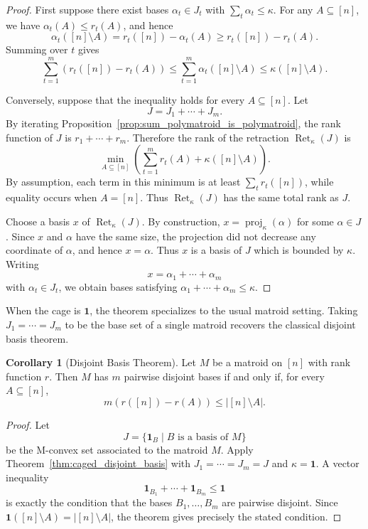 \documentclass[11pt]{article}
\theoremstyle{definition}
\newtheorem{corollary}[theorem]{Corollary}
\theoremstyle{remark}
\newcommand{\ones}{\textbf{1}}
\DeclareMathOperator{\proj}{proj}              %
\newcommand{\kproj}{\proj_{\kappa}}            %
\DeclareMathOperator{\Ret}{Ret}                %
\newcommand{\RetK}{\Ret_{\kappa}}              %
\begin{document}
\begin{proof}
    First suppose there exist bases $\alpha_t\in J_t$ with
    $\sum_t\alpha_t\leq\kappa$. For any $A\subseteq[n]$, we have
    $\alpha_t(A)\leq r_t(A)$, and hence
    \[
        \alpha_t([n]\setminus A)
        =
        r_t([n])-\alpha_t(A)
        \geq
        r_t([n])-r_t(A).
    \]
    Summing over $t$ gives
    \[
        \sum_{t=1}^m
        \left(
            r_t([n])-r_t(A)
        \right)
        \leq
        \sum_{t=1}^m\alpha_t([n]\setminus A)
        \leq
        \kappa([n]\setminus A).
    \]

    Conversely, suppose that the inequality holds for every
    $A\subseteq[n]$. Let
    \[
        J=J_1+\cdots+J_m.
    \]
    By iterating
    Proposition~\ref{prop:sum_polymatroid_is_polymatroid}, the rank
    function of $J$ is $r_1+\cdots+r_m$. Therefore the rank of the
    retraction $\RetK(J)$ is
    \[
        \min_{A\subseteq[n]}
        \left(
            \sum_{t=1}^m r_t(A)
            +
            \kappa([n]\setminus A)
        \right).
    \]
    By assumption, each term in this minimum is at least
    $\sum_t r_t([n])$, while equality occurs when $A=[n]$. Thus
    $\RetK(J)$ has the same total rank as $J$.

    Choose a basis $x$ of $\RetK(J)$. By construction,
    $x=\kproj(\alpha)$ for some $\alpha\in J$. Since $x$ and $\alpha$ have
    the same size, the projection did not decrease any coordinate of
    $\alpha$, and hence $x=\alpha$. Thus $x$ is a basis of $J$ which is
    bounded by $\kappa$. Writing
    \[
        x=\alpha_1+\cdots+\alpha_m
    \]
    with $\alpha_t\in J_t$, we obtain bases satisfying
    $\alpha_1+\cdots+\alpha_m\leq\kappa$.
\end{proof}

When the cage is $\ones$, the theorem specializes to the usual matroid
setting. Taking $J_1=\cdots=J_m$ to be the base set of a single matroid
recovers the classical disjoint basis theorem.

\begin{corollary}[Disjoint Basis Theorem]
\label{corr:disjoint_basis_theorem}
    Let $M$ be a matroid on $[n]$ with rank function $r$. Then $M$ has $m$
    pairwise disjoint bases if and only if, for every $A\subseteq[n]$,
    \[
        m\left(r([n])-r(A)\right)
        \leq
        |[n]\setminus A|.
    \]
\end{corollary}

\begin{proof}
    Let
    \[
        J
        =
        \{\ones_B\mid B\text{ is a basis of }M\}
    \]
    be the M-convex set associated to the matroid $M$. Apply
    Theorem~\ref{thm:caged_disjoint_basis} with
    $J_1=\cdots=J_m=J$ and $\kappa=\ones$. A vector inequality
    \[
        \ones_{B_1}+\cdots+\ones_{B_m}\leq\ones
    \]
    is exactly the condition that the bases $B_1,\dots,B_m$ are pairwise
    disjoint. Since
    $\ones([n]\setminus A)=|[n]\setminus A|$, the theorem gives precisely
    the stated condition.
\end{proof}
\end{document}
